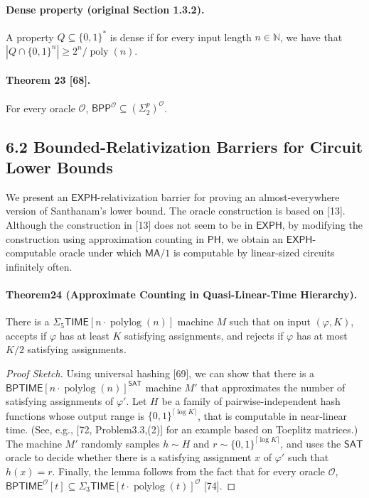 \documentclass[10pt,a4paper]{article}
\begin{document}
\paragraph{Dense property (original Section 1.3.2).} A property $Q\subseteq\{0,1\}^*$ is dense if for every input length $n\in\mathbb N$, we have that $|Q\cap\{0,1\}^n|\geq2^n/\operatorname{poly}(n)$.
\paragraph{Theorem 23 [68].} For every oracle $\mathcal O$, $\mathsf{BPP}^{\mathcal O}\subseteq(\Sigma^p_2)^{\mathcal O}$.

\subsection*{6.2 Bounded-Relativization Barriers for Circuit Lower Bounds}
We present an $\mathsf{EXPH}$-relativization barrier for proving an almost-everywhere version of Santhanam's lower bound. The oracle construction is based on [13]. Although the construction in [13] does not seem to be in $\mathsf{EXPH}$, by modifying the construction using approximation counting in $\mathsf{PH}$, we obtain an $\mathsf{EXPH}$-computable oracle under which $\mathsf{MA}/1$ is computable by linear-sized circuits infinitely often.
\paragraph{Theorem24 (Approximate Counting in Quasi-Linear-Time Hierarchy).} There is a $\Sigma_5\mathsf{TIME}[n\cdot\operatorname{polylog}(n)]$ machine $M$ such that on input $(\varphi,K)$, accepts if $\varphi$ has at least $K$ satisfying assignments, and rejects if $\varphi$ has at most $K/2$ satisfying assignments.
\begin{proof}[Proof Sketch]
Using universal hashing [69], we can show that there is a $\mathsf{BPTIME}[n\cdot\operatorname{polylog}(n)]^{\mathsf{SAT}}$ machine $M'$ that approximates the number of satisfying assignments of $\varphi'$. Let $H$ be a family of pairwise-independent hash functions whose output range is $\{0,1\}^{\lceil\log K\rceil}$, that is computable in near-linear time. (See, e.g., [72, Problem3.3,(2)] for an example based on Toeplitz matrices.) The machine $M'$ randomly samples $h\sim H$ and $r\sim\{0,1\}^{\lceil\log K\rceil}$, and uses the $\mathsf{SAT}$ oracle to decide whether there is a satisfying assignment $x$ of $\varphi'$ such that $h(x)=r$.
Finally, the lemma follows from the fact that for every oracle $\mathcal O$, $\mathsf{BPTIME}^{\mathcal O}[t]\subseteq\Sigma_3\mathsf{TIME}[t\cdot\operatorname{polylog}(t)]^{\mathcal O}$ [74].
\end{proof}
\end{document}
